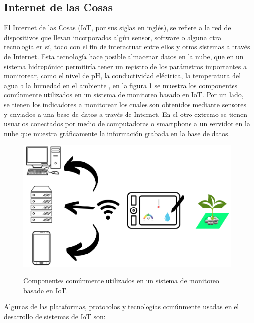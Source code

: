 \subsection{Internet de las Cosas}
El Internet de las Cosas (IoT, por sus siglas en inglés), se refiere a la red de dispositivos que llevan incorporados algún sensor, software o alguna otra tecnología en sí, todo con el fin de interactuar entre ellos y otros sistemas a través de Internet. Esta tecnología hace posible almacenar datos en la nube, que en un sistema hidropónico permitiría tener un registro de los parámetros importantes a monitorear, como el nivel de pH, la conductividad eléctrica, la temperatura del agua o la humedad en el ambiente \cite{mehra2018iot}, en la figura \ref{IoT} se muestra los componentes comúnmente utilizados en un sistema de monitoreo basado en IoT. Por un lado, se tienen los indicadores a monitorear los cuales son obtenidos mediante sensores y enviados a una base de datos a través de Internet. En el otro extremo se tienen usuarios conectados por medio de computadoras o smartphone a un servidor en la nube que muestra gráficamente la información grabada en la base de datos.
\begin{figure}[!ht]
\centering
         \includegraphics[scale=0.45]{imgs/iot_nueva.PNG} \\
    \caption{Componentes comúnmente utilizados en un sistema de monitoreo basado en IoT. }\label{IoT}
\end{figure}

Algunas de las plataformas, protocolos y tecnologías comúnmente usadas en el desarrollo de sistemas de IoT son:

